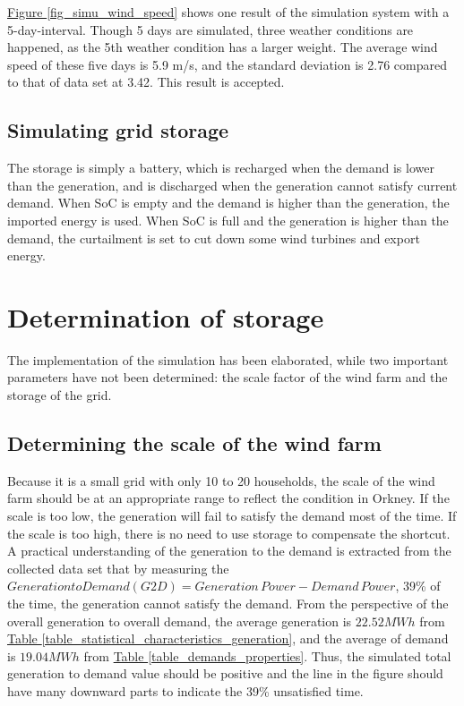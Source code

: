 \documentclass[12pt,a4paper]{report}
\begin{document}
                \hyperref[fig_simu_wind_speed]{Figure \ref*{fig_simu_wind_speed}} shows one result of the simulation system with a 5-day-interval. Though 5 days are simulated, three weather conditions are happened, as the 5th weather condition has a larger weight. The average wind speed of these five days is 5.9 m/s, and the standard deviation is 2.76 compared to that of data set at 3.42. This result is accepted.

                \subsection{Simulating grid storage}
                The storage is simply a battery, which is recharged when the demand is lower than the generation, and is discharged when the generation cannot satisfy current demand. When SoC is empty and the demand is higher than the generation, the imported energy is used. When SoC is full and the generation is higher than the demand, the curtailment is set to cut down some wind turbines and export energy.

            \section{Determination of storage}
            The implementation of the simulation has been elaborated, while two important parameters have not been determined: the scale factor of the wind farm and the storage of the grid. 

            \subsection{Determining the scale of the wind farm}
            Because it is a small grid with only 10 to 20 households, the scale of the wind farm should be at an appropriate range to reflect the condition in Orkney. If the scale is too low, the generation will fail to satisfy the demand most of the time. If the scale is too high, there is no need to use storage to compensate the shortcut. A practical understanding of the generation to the demand is extracted from the collected data set that by measuring the $Generation to Demand (G2D) = Generation\, Power - Demand\, Power $, 39\% of the time, the generation cannot satisfy the demand. From the perspective of the overall generation to overall demand, the average generation is $22.52 MWh$ from \hyperref[table_statistical_characteristics_generation]{Table \ref*{table_statistical_characteristics_generation}}, and the average of demand is $19.04 MWh$ from \hyperref[table_demands_properties]{Table \ref*{table_demands_properties}}. Thus, the simulated total generation to demand value should be positive and the line in the figure should have many downward parts to indicate the 39\% unsatisfied time.
\end{document}
